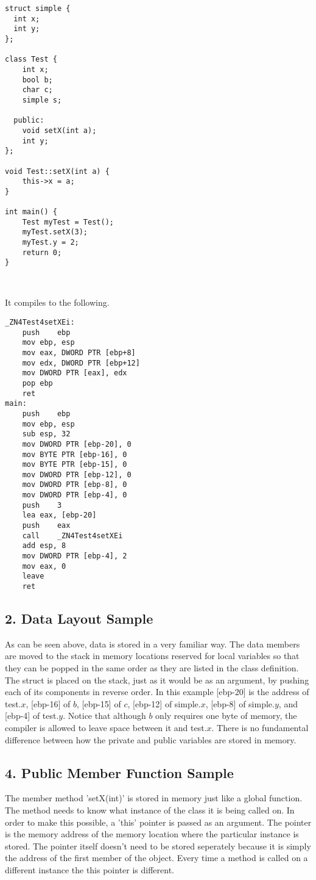 \documentclass{article}
\begin{document}
\begin{lstlisting}
struct simple {
  int x;
  int y;
};

class Test {
    int x;
    bool b;
    char c;
    simple s;

  public:
    void setX(int a);
    int y;
};

void Test::setX(int a) {
    this->x = a;
}

int main() {
    Test myTest = Test();
    myTest.setX(3);
    myTest.y = 2;
    return 0;
}



\end{lstlisting}
It compiles to the following.
\begin{lstlisting}
_ZN4Test4setXEi:
	push	ebp
	mov	ebp, esp
	mov	eax, DWORD PTR [ebp+8]
	mov	edx, DWORD PTR [ebp+12]
	mov	DWORD PTR [eax], edx
	pop	ebp
	ret
main:
	push	ebp
	mov	ebp, esp
	sub	esp, 32
	mov	DWORD PTR [ebp-20], 0
	mov	BYTE PTR [ebp-16], 0
	mov	BYTE PTR [ebp-15], 0
	mov	DWORD PTR [ebp-12], 0
	mov	DWORD PTR [ebp-8], 0
	mov	DWORD PTR [ebp-4], 0
	push	3
	lea	eax, [ebp-20]
	push	eax
	call	_ZN4Test4setXEi
	add	esp, 8
	mov	DWORD PTR [ebp-4], 2
	mov	eax, 0
	leave
	ret
\end{lstlisting}
\subsection*{2. Data Layout Sample}
As can be seen above, data is stored in a very familiar way. The data members are moved to the stack in memory locations reserved for local variables so that they can be popped in the same order as they are listed in the class definition. The struct is placed on the stack, just as it would be as an argument, by pushing each of its components in reverse order. In this example [ebp-20] is the address of test.$x$, [ebp-16] of $b$, [ebp-15] of $c$, [ebp-12] of simple.$x$, [ebp-8] of simple.$y$, and [ebp-4] of test.$y$. Notice that although $b$ only requires one byte of memory, the compiler is allowed to leave space between it and test.$x$.
There is no fundamental difference between how the private and public variables are stored in memory. 

\subsection*{4. Public Member Function Sample}
The member method 'setX(int)' is stored in memory just like a global function. The method needs to know what instance of the class it is being called on. In order to make this possible, a 'this' pointer is passed as an argument. The pointer is the memory address of the memory location where the particular instance is stored. The pointer itself doesn't need to be stored seperately because it is simply the address of the first member of the object. Every time a method is called on a different instance the this pointer is different.
\end{document}
